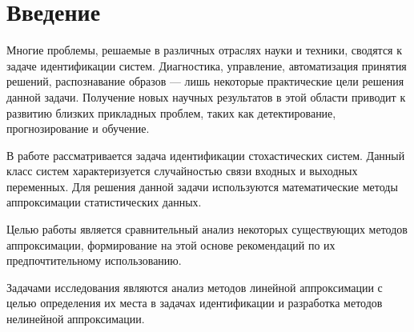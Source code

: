 \chapter*{Введение}

Многие проблемы, решаемые в различных отраслях науки и техники, сводятся к задаче идентификации систем.
Диагностика, управление, автоматизация принятия решений, распознавание образов ---
лишь некоторые практические цели решения данной задачи.
Получение новых научных результатов в этой области приводит к развитию близких прикладных проблем,
таких как детектирование, прогнозирование и обучение.

В работе рассматривается задача идентификации стохастических систем.
Данный класс систем характеризуется случайностью связи входных и выходных переменных.
Для решения данной задачи используются математические методы аппроксимации статистических данных.

Целью работы является сравнительный анализ некоторых существующих методов аппроксимации,
формирование на этой основе рекомендаций по их предпочтительному использованию.

Задачами исследования являются анализ методов линейной аппроксимации с целью определения их места
в задачах идентификации и разработка методов нелинейной аппроксимации.

